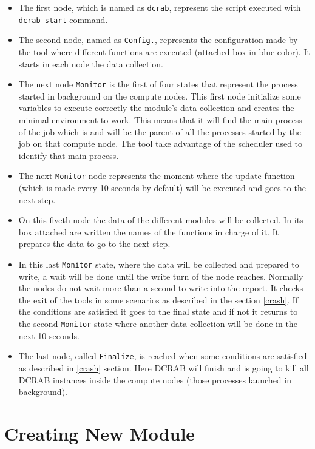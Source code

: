 \documentclass[10pt,a4paper]{report}
\begin{document}
\begin{itemize}
  \item The first node, which is named as \verb+dcrab+, represent the script executed with \verb+dcrab start+ command.
  \item The second node, named as \verb+Config.+, represents the configuration made by the tool where different functions are executed (attached box in blue color). It starts in each node the data collection.
  \item The next node \verb+Monitor+ is the first of four states that represent the process started in background on the compute nodes. This first node initialize some variables to execute correctly the module's data collection and creates the minimal environment to work. This means that it will find the main process of the job which is and will be the parent of all the processes started by the job on that compute node. The tool take advantage of the scheduler used to identify that main process.
  \item The next \verb+Monitor+ node represents the moment where the update function (which is made every 10 seconds by default) will be executed and goes to the next step.
  \item On this fiveth node the data of the different modules will be collected. In its box attached are written the names of the functions in charge of it. It prepares the data to go to the next step.
  \item In this last \verb+Monitor+ state, where the data will be collected and prepared to write, a wait will be done until the write turn of the node reaches. Normally the nodes do not wait more than a second to write into the report. It checks the exit of the tools in some scenarios as described in the section \ref{crash}. If the conditions are satisfied it goes to the final state and if not it returns to the second \verb+Monitor+ state where another data collection will be done in the next 10 seconds.
  \item The last node, called \verb+Finalize+, is reached when some conditions are satisfied as described in \ref{crash} section. Here DCRAB will finish and is going to kill all DCRAB instances inside the compute nodes (those processes launched in background).
\end{itemize}

\chapter{Creating New Module}
\end{document}
